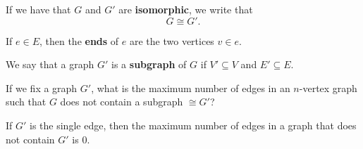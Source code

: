 
\begin{definition}
	If we have that \( G \) and \( G' \) are \textbf{isomorphic}, we write that \[
		G \cong G'
	.\] 
\end{definition}

\begin{definition}
	If \( e \in E \), then the \textbf{ends} of \( e \) are the two vertices \( v \in e \).
\end{definition}

\begin{definition}
	We say that a graph \( G' \) is a \textbf{subgraph} of \( G \) if \( V' \subseteq V \) and \( E' \subseteq E \).
\end{definition}

If we fix a graph \( G' \), what is the maximum number of edges in an \( n \)-vertex graph such that \( G \) does not contain a subgraph \( \cong G' \)?

\begin{eg}
	If \( G' \) is the single edge, then the maximum number of edges in a graph that does not contain \( G' \) is 0.
\end{eg}
